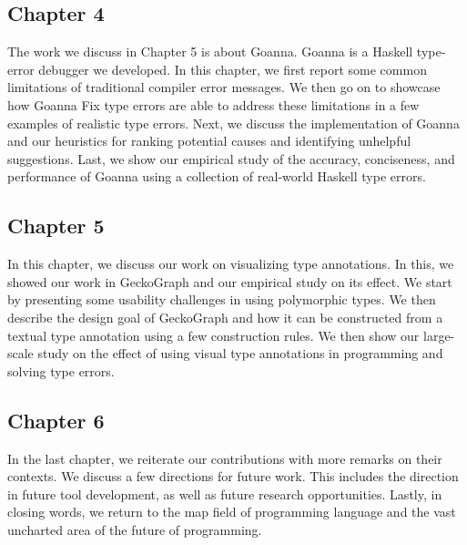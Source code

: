 \subsection{Chapter 4}

The work we discuss in Chapter 5 is about Goanna. Goanna is a Haskell type-error debugger we developed. In this chapter, we first report some common limitations of traditional compiler error messages. We then go on to showcase how Goanna Fix type errors are able to address these limitations in a few examples of realistic type errors.  Next, we discuss the implementation of Goanna and our heuristics for ranking potential causes and identifying unhelpful suggestions. Last, we show our empirical study of the accuracy, conciseness, and performance of Goanna using a collection of real-world Haskell type errors. 

\subsection{Chapter 5}

In this chapter, we discuss our work on visualizing type annotations. In this, we showed our work in GeckoGraph and our empirical study on its effect. We start by presenting some usability challenges in using polymorphic types. We then describe the design goal of GeckoGraph and how it can be constructed from a textual type annotation using a few construction rules. We then show our large-scale study on the effect of using visual type annotations in programming and solving type errors. 


\subsection{Chapter 6}

In the last chapter, we reiterate our contributions with more remarks on their contexts. We discuss a few directions for future work. This includes the direction in future tool development, as well as future research opportunities. Lastly, in closing words, we return to the map field of programming language and the vast uncharted area of the future of programming. 